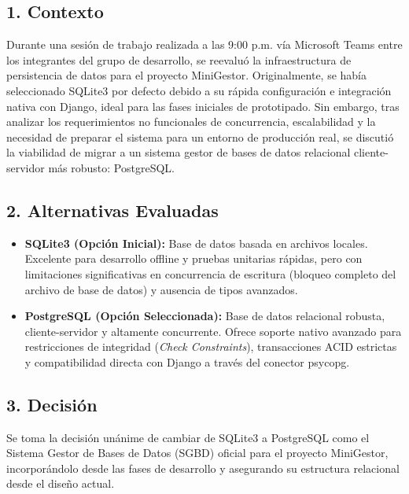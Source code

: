 \documentclass[11pt,a4paper]{article}
\begin{document}
\subsection{1. Contexto}
Durante una sesión de trabajo realizada a las 9:00 p.m. vía Microsoft Teams entre los integrantes del grupo de desarrollo, se reevaluó la infraestructura de persistencia de datos para el proyecto MiniGestor. Originalmente, se había seleccionado SQLite3 por defecto debido a su rápida configuración e integración nativa con Django, ideal para las fases iniciales de prototipado. Sin embargo, tras analizar los requerimientos no funcionales de concurrencia, escalabilidad y la necesidad de preparar el sistema para un entorno de producción real, se discutió la viabilidad de migrar a un sistema gestor de bases de datos relacional cliente-servidor más robusto: PostgreSQL.

\subsection{2. Alternativas Evaluadas}
\begin{itemize}[leftmargin=*]
    \item \textbf{SQLite3 (Opción Inicial):} Base de datos basada en archivos locales. Excelente para desarrollo offline y pruebas unitarias rápidas, pero con limitaciones significativas en concurrencia de escritura (bloqueo completo del archivo de base de datos) y ausencia de tipos avanzados.
    \item \textbf{PostgreSQL (Opción Seleccionada):} Base de datos relacional robusta, cliente-servidor y altamente concurrente. Ofrece soporte nativo avanzado para restricciones de integridad (\textit{Check Constraints}), transacciones ACID estrictas y compatibilidad directa con Django a través del conector psycopg.
\end{itemize}

\subsection{3. Decisión}
Se toma la decisión unánime de cambiar de SQLite3 a PostgreSQL como el Sistema Gestor de Bases de Datos (SGBD) oficial para el proyecto MiniGestor, incorporándolo desde las fases de desarrollo y asegurando su estructura relacional desde el diseño actual.
\end{document}
